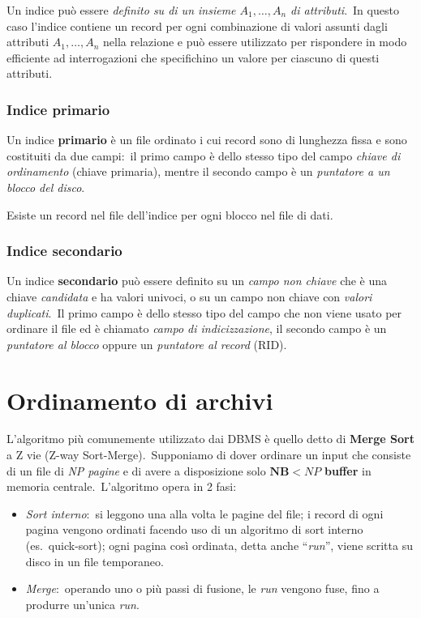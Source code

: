 Un indice può essere \textit{definito su di un insieme $A_1, \dots, A_n$ di attributi}.\
In questo caso l'indice contiene un record per ogni combinazione di valori assunti dagli attributi $A_1, \dots, A_n$ nella relazione e può essere utilizzato per rispondere in modo efficiente ad interrogazioni che specifichino un valore per ciascuno di questi attributi.

\subsubsection{Indice primario}

Un indice \textbf{primario} è un file ordinato i cui record sono di lunghezza fissa e sono costituiti da due campi:\ il primo campo è dello stesso tipo del campo \textit{chiave di ordinamento} (chiave primaria), mentre il secondo campo è un \textit{puntatore a un blocco del disco}.\

Esiste un record nel file dell'indice per ogni blocco nel file di dati.

\subsubsection{Indice secondario}

Un indice \textbf{secondario} può essere definito su un \textit{campo non chiave} che è una chiave \textit{candidata} e ha valori univoci, o su un campo non chiave con \textit{valori duplicati}.\
Il primo campo è dello stesso tipo del campo che non viene usato per ordinare il file ed è chiamato \textit{campo di indicizzazione}, il secondo campo è un \textit{puntatore al blocco} oppure un \textit{puntatore al record} (RID).\

\section{Ordinamento di archivi}

L'algoritmo più comunemente utilizzato dai DBMS è quello detto di \textbf{Merge Sort} a Z vie (Z-way Sort-Merge).\
Supponiamo di dover ordinare un input che consiste di un file di \textit{NP pagine} e di avere a disposizione solo $\mathbf{NB} < \mathit{NP}$ \textbf{buffer} in memoria centrale.\
L'algoritmo opera in 2 fasi:
\begin{itemize}
	\item \textit{Sort interno}:\ si leggono una alla volta le pagine del file; i record di ogni pagina vengono ordinati facendo uso di un algoritmo di sort interno (es.\ quick-sort); ogni pagina così ordinata, detta anche ``\textit{run}'', viene scritta su disco in un file temporaneo.
	\item \textit{Merge}:\ operando uno o più passi di fusione, le \textit{run} vengono fuse, fino a produrre un'unica \textit{run}.
\end{itemize}

